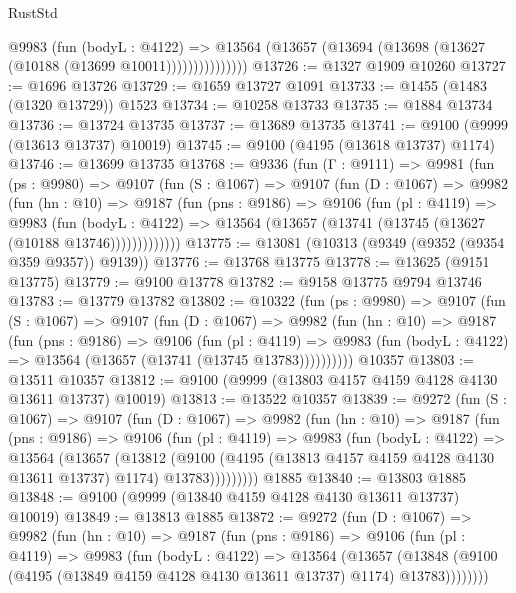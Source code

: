 \begin{lexlean}{RustStd}
\begin{coremodule}
                  @9983
                    (fun (bodyL : @4122) =>
                    @13564 (@13657 (@13694 (@13698 (@13627 (@10188 (@13699 @10011)))))))))))))))
@13726 := @1327 @1909 @10260
@13727 := @1696 @13726
@13729 := @1659 @13727 @1091
@13733 := @1455 (@1483 (@1320 @13729)) @1523
@13734 := @10258 @13733
@13735 := @1884 @13734
@13736 := @13724 @13735
@13737 := @13689 @13735
@13741 := @9100 (@9999 (@13613 @13737) @10019)
@13745 := @9100 (@4195 (@13618 @13737) @1174)
@13746 := @13699 @13735
@13768 := @9336
    (fun (Γ : @9111) =>
    @9981
      (fun (ps : @9980) =>
      @9107
        (fun (S : @1067) =>
        @9107
          (fun (D : @1067) =>
          @9982
            (fun (hn : @10) =>
            @9187
              (fun (pns : @9186) =>
              @9106
                (fun (pl : @4119) =>
                @9983
                  (fun (bodyL : @4122) =>
                  @13564 (@13657 (@13741 (@13745 (@13627 (@10188 @13746)))))))))))))
@13775 := @13081 (@10313 (@9349 (@9352 (@9354 @359 @9357)) @9139))
@13776 := @13768 @13775
@13778 := @13625 (@9151 @13775)
@13779 := @9100 @13778
@13782 := @9158 @13775 @9794 @13746
@13783 := @13779 @13782
@13802 := @10322
    (fun (ps : @9980) =>
    @9107
      (fun (S : @1067) =>
      @9107
        (fun (D : @1067) =>
        @9982
          (fun (hn : @10) =>
          @9187
            (fun (pns : @9186) =>
            @9106
              (fun (pl : @4119) =>
              @9983 (fun (bodyL : @4122) => @13564 (@13657 (@13741 (@13745 @13783))))))))))
    @10357
@13803 := @13511 @10357
@13812 := @9100 (@9999 (@13803 @4157 @4159 @4128 @4130 @13611 @13737) @10019)
@13813 := @13522 @10357
@13839 := @9272
    (fun (S : @1067) =>
    @9107
      (fun (D : @1067) =>
      @9982
        (fun (hn : @10) =>
        @9187
          (fun (pns : @9186) =>
          @9106
            (fun (pl : @4119) =>
            @9983
              (fun (bodyL : @4122) =>
              @13564
                (@13657
                  (@13812
                    (@9100
                      (@4195 (@13813 @4157 @4159 @4128 @4130 @13611 @13737) @1174)
                      @13783)))))))))
    @1885
@13840 := @13803 @1885
@13848 := @9100 (@9999 (@13840 @4159 @4128 @4130 @13611 @13737) @10019)
@13849 := @13813 @1885
@13872 := @9272
    (fun (D : @1067) =>
    @9982
      (fun (hn : @10) =>
      @9187
        (fun (pns : @9186) =>
        @9106
          (fun (pl : @4119) =>
          @9983
            (fun (bodyL : @4122) =>
            @13564
              (@13657
                (@13848 (@9100 (@4195 (@13849 @4159 @4128 @4130 @13611 @13737) @1174) @13783))))))))

\end{coremodule}
\end{lexlean}
